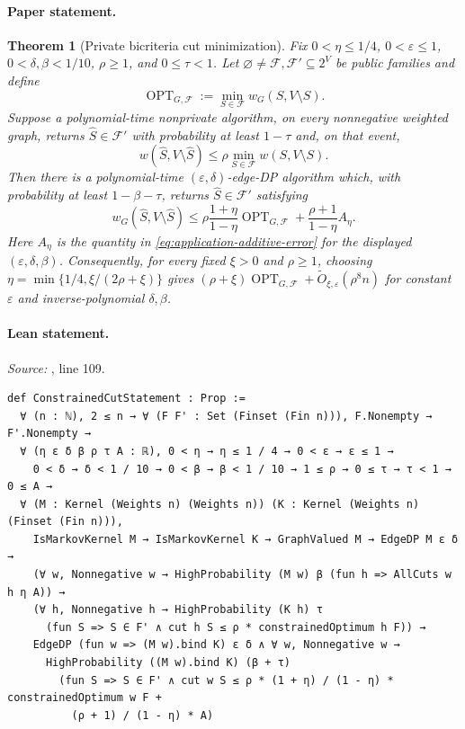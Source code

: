 \documentclass[a4paper,10pt]{article}
\newtheorem{theorem}{Theorem}
\theoremstyle{definition}
\theoremstyle{remark}
\renewcommand{\emptyset}{\varnothing}
\newcommand{\SourceId}[1]{\texttt{\detokenize{#1}}}
\begin{document}
\paragraph{Paper statement.}
\setcounter{theorem}{33}
\begin{theorem}[Private bicriteria cut minimization]
\label{thm:private-constrained-cut}
Fix $0<\eta\leq1/4$, $0<\varepsilon\leq1$, $0<\delta,\beta<1/10$,
$\rho\geq1$, and $0\leq\tau<1$.  Let
$\emptyset\ne\mathcal F,\mathcal F'\subseteq2^V$ be public families and
define
\[
 \operatorname{OPT}_{G,\mathcal F}
 :=\min_{S\in\mathcal F}w_G(S,V\setminus S).
\]
Suppose a polynomial-time nonprivate algorithm, on every nonnegative weighted graph, returns
$\widehat S\in\mathcal F'$ with probability at least $1-\tau$ and, on that event,
\[
 w(\widehat S,V\setminus\widehat S)
 \leq \rho\min_{S\in\mathcal F}w(S,V\setminus S).
\]
Then there is a polynomial-time $(\varepsilon, \delta)$-edge-DP algorithm which, with probability
at least $1-\beta-\tau$, returns $\widehat S\in\mathcal F'$ satisfying
\[
 w_G(\widehat S,V\setminus\widehat S)
 \leq \rho\frac{1+\eta}{1-\eta}\operatorname{OPT}_{G,\mathcal F}
   +\frac{\rho+1}{1-\eta}A_\eta.
\]
Here $A_\eta$ is the quantity in \eqref{eq:application-additive-error} for the displayed
$(\varepsilon, \delta,\beta)$.
Consequently, for every fixed $\xi>0$ and $\rho\geq1$, choosing
$\eta=\min\{1/4,\xi/(2\rho+\xi)\}$ gives
$(\rho+\xi)\operatorname{OPT}_{G,\mathcal F}
+\widetilde O_{\xi,\varepsilon}(\rho^{8}n)$ for constant $\varepsilon$ and
inverse-polynomial $\delta,\beta$.
\end{theorem}
\paragraph{Lean statement.}
\textit{Source:} \SourceId{DPCut/Applications.lean}, line 109.
\begin{lstlisting}[style=lean,firstnumber=109]
def ConstrainedCutStatement : Prop :=
  ∀ (n : ℕ), 2 ≤ n → ∀ (F F' : Set (Finset (Fin n))), F.Nonempty → F'.Nonempty →
  ∀ (η ε δ β ρ τ A : ℝ), 0 < η → η ≤ 1 / 4 → 0 < ε → ε ≤ 1 →
    0 < δ → δ < 1 / 10 → 0 < β → β < 1 / 10 → 1 ≤ ρ → 0 ≤ τ → τ < 1 → 0 ≤ A →
  ∀ (M : Kernel (Weights n) (Weights n)) (K : Kernel (Weights n) (Finset (Fin n))),
    IsMarkovKernel M → IsMarkovKernel K → GraphValued M → EdgeDP M ε δ →
    (∀ w, Nonnegative w → HighProbability (M w) β (fun h => AllCuts w h η A)) →
    (∀ h, Nonnegative h → HighProbability (K h) τ
      (fun S => S ∈ F' ∧ cut h S ≤ ρ * constrainedOptimum h F)) →
    EdgeDP (fun w => (M w).bind K) ε δ ∧ ∀ w, Nonnegative w →
      HighProbability ((M w).bind K) (β + τ)
        (fun S => S ∈ F' ∧ cut w S ≤ ρ * (1 + η) / (1 - η) * constrainedOptimum w F +
          (ρ + 1) / (1 - η) * A)
\end{lstlisting}
\end{document}
